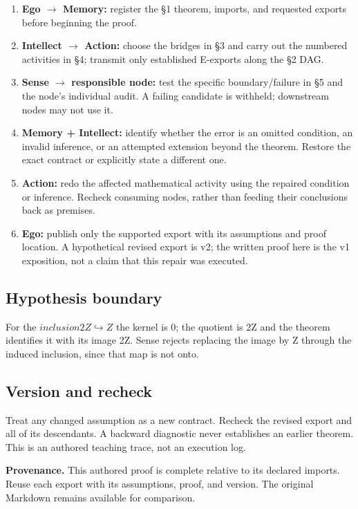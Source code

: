 \documentclass[preprint,12pt,aps,pra,showkeys,amsmath,amssymb,superscriptaddress,floatfix]{revtex4-2}
\theoremstyle{definition}
\theoremstyle{remark}
\providecommand{\tightlist}{\setlength{\itemsep}{2pt}\setlength{\parskip}{0pt}}
\begin{document}
\begin{enumerate}
\def\labelenumi{\arabic{enumi}.}
\tightlist
\item
  \textbf{Ego \(\to\) Memory:} register the §1 theorem, imports, and
  requested exports before beginning the proof.
\item
  \textbf{Intellect \(\to\) Action:} choose the bridges in §3 and carry
  out the numbered activities in §4; transmit only established E-exports
  along the §2 DAG.
\item
  \textbf{Sense \(\to\) responsible node:} test the specific
  boundary/failure in §5 and the node's individual audit. A failing
  candidate is withheld; downstream nodes may not use it.
\item
  \textbf{Memory + Intellect:} identify whether the error is an omitted
  condition, an invalid inference, or an attempted extension beyond the
  theorem. Restore the exact contract or explicitly state a different
  one.
\item
  \textbf{Action:} redo the affected mathematical activity using the
  repaired condition or inference. Recheck consuming nodes, rather than
  feeding their conclusions back as premises.
\item
  \textbf{Ego:} publish only the supported export with its assumptions
  and proof location. A hypothetical revised export is v2; the written
  proof here is the v1 exposition, not a claim that this repair was
  executed.
\end{enumerate}

\subsection{Hypothesis boundary}
For the \(inclusion2Z\hookrightarrow Z\) the kernel is 0; the quotient
is 2Z and the theorem identifies it with its image 2Z. Sense rejects
replacing the image by Z through the induced inclusion, since that map
is not onto.

\subsection{Version and recheck}
Treat any changed assumption as a new contract. Recheck the revised
export and all of its descendants. A backward diagnostic never
establishes an earlier theorem. This is an authored teaching trace, not
an execution log.

\par\medskip\begingroup\small\linespread{1.0}\selectfont\noindent\textbf{Provenance.} This authored proof is complete relative to its declared imports. Reuse
each export with its assumptions, proof, and version. The original
Markdown remains available for comparison.
\par\endgroup
\end{document}
